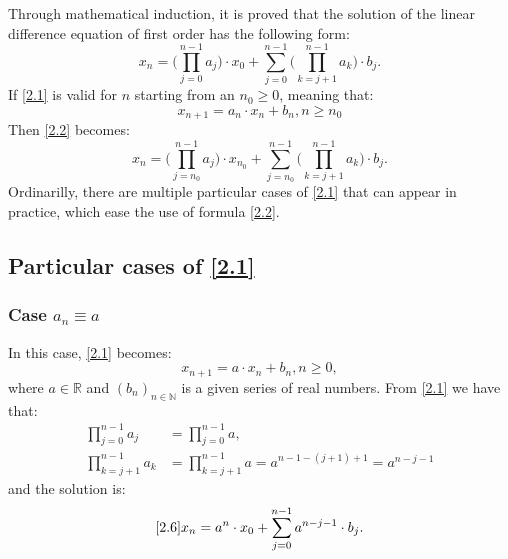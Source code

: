\documentclass[a4paper, 11pt]{report}
\newcommand{\R}{\mathbb{R}}
\begin{document}
Through mathematical induction, it is proved that the solution of the linear difference equation of first order has the following form:
\begin{equation}\label{2.2}
 x_{n}=\bigg( \prod_{j=0}^{n-1} a_{j} \bigg) \cdot x_{0} + \sum_{j=0}^{n-1} \bigg( \prod_{k=j+1}^{n-1} a_{k} \bigg)\cdot b_{j}.
\end{equation}
If \eqref{2.1} is valid for $n$ starting from an $n_{0} \geq 0$, meaning that:
\begin{equation}\label{2.3}
 x_{n+1}=a_{n}\cdot x_{n}+b_{n}, n\geq n_{0}
\end{equation}
Then \eqref{2.2} becomes:
\begin{equation}
 x_{n}=\bigg( \prod_{j=n_{0}}^{n-1} a_{j} \bigg) \cdot x_{n_{0}} + \sum_{j=n_{0}}^{n-1} \bigg( \prod_{k=j+1}^{n-1} a_{k} \bigg)\cdot b_{j}.
\end{equation}
Ordinarilly, there are multiple particular cases of \eqref{2.1} that can appear in practice, which ease the use of formula \eqref{2.2}.
\subsection{Particular cases of \eqref{2.1}}
\subsubsection{Case $a_{n}\equiv a$} \label{i}
In this case, \eqref{2.1} becomes:
\begin{equation}
\label{2.6}
 x_{n+1}=a\cdot x_{n}+b_{n}, n\geq 0,
\end{equation}
where $a\in \R$ and $(b_{n})_{n\in\mathbb{N}}$ is a given series of real numbers.
From \eqref{2.1} we have that:
\begin{align*}
 \prod_{j=0}^{n-1} a_{j} &=\prod_{j=0}^{n-1} a,\\
 \prod_{k=j+1}^{n-1} a_{k}&=\prod_{k=j+1}^{n-1} a=a^{n-1-(j+1)+1}=a^{n-j-1}
\end{align*}
and the solution is:
\begin{equation}\eqref{2.6}
 x_{n}=a^{n}\cdot x_{0}+\sum_{j=0}^{n-1} a^{n-j-1}\cdot b_{j}.
\end{equation}
\end{document}
